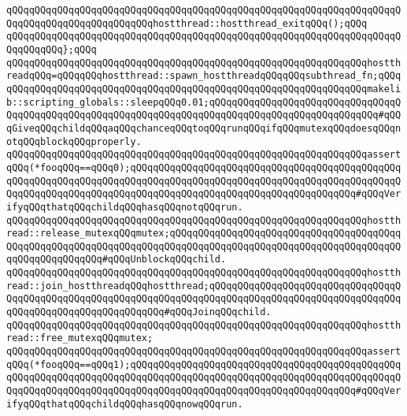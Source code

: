 \verb|qQQqqQQqqQQqqQQqqQQqqQQqqQQqqQQqqQQqqQQqqQQqqQQqqQQqqQQqqQQqqQQqqQQqqQQqqQQqqQQqqQQqqQQqqQQqqQQqhostthread::hostthread_exitqQQq();qQQq|\newline
\verb|qQQqqQQqqQQqqQQqqQQqqQQqqQQqqQQqqQQqqQQqqQQqqQQqqQQqqQQqqQQqqQQqqQQqqQQqqQQqqQQq};qQQq|\newline
\newline
\verb|qQQqqQQqqQQqqQQqqQQqqQQqqQQqqQQqqQQqqQQqqQQqqQQqqQQqqQQqqQQqqQQqhostthreadqQQq=qQQqqQQqhostthread::spawn_hostthreadqQQqqQQqsubthread_fn;qQQq|\newline
\newline
\verb|qQQqqQQqqQQqqQQqqQQqqQQqqQQqqQQqqQQqqQQqqQQqqQQqqQQqqQQqqQQqqQQqmakelib::scripting_globals::sleepqQQq0.01;qQQqqQQqqQQqqQQqqQQqqQQqqQQqqQQqqQQqqQQqqQQqqQQqqQQqqQQqqQQqqQQqqQQqqQQqqQQqqQQqqQQqqQQqqQQqqQQqqQQq#qQQqGiveqQQqchildqQQqaqQQqchanceqQQqtoqQQqrunqQQqifqQQqmutexqQQqdoesqQQqnotqQQqblockqQQqproperly.|\newline
\newline
\verb|qQQqqQQqqQQqqQQqqQQqqQQqqQQqqQQqqQQqqQQqqQQqqQQqqQQqqQQqqQQqqQQqassertqQQq(*fooqQQq==qQQq0);qQQqqQQqqQQqqQQqqQQqqQQqqQQqqQQqqQQqqQQqqQQqqQQqqQQqqQQqqQQqqQQqqQQqqQQqqQQqqQQqqQQqqQQqqQQqqQQqqQQqqQQqqQQqqQQqqQQqqQQqqQQqqQQqqQQqqQQqqQQqqQQqqQQqqQQqqQQqqQQqqQQqqQQqqQQqqQQqqQQq#qQQqVerifyqQQqthatqQQqchildqQQqhasqQQqnotqQQqrun.|\newline
\newline
\verb|qQQqqQQqqQQqqQQqqQQqqQQqqQQqqQQqqQQqqQQqqQQqqQQqqQQqqQQqqQQqqQQqhostthread::release_mutexqQQqmutex;qQQqqQQqqQQqqQQqqQQqqQQqqQQqqQQqqQQqqQQqqQQqqQQqqQQqqQQqqQQqqQQqqQQqqQQqqQQqqQQqqQQqqQQqqQQqqQQqqQQqqQQqqQQqqQQqqQQqqQQqqQQqqQQq#qQQqUnblockqQQqchild.|\newline
\newline
\verb|qQQqqQQqqQQqqQQqqQQqqQQqqQQqqQQqqQQqqQQqqQQqqQQqqQQqqQQqqQQqqQQqhostthread::join_hostthreadqQQqhostthread;qQQqqQQqqQQqqQQqqQQqqQQqqQQqqQQqqQQqqQQqqQQqqQQqqQQqqQQqqQQqqQQqqQQqqQQqqQQqqQQqqQQqqQQqqQQqqQQqqQQqqQQqqQQqqQQqqQQqqQQqqQQqqQQqqQQq#qQQqJoinqQQqchild.|\newline
\newline
\verb|qQQqqQQqqQQqqQQqqQQqqQQqqQQqqQQqqQQqqQQqqQQqqQQqqQQqqQQqqQQqqQQqhostthread::free_mutexqQQqmutex;|\newline
\newline
\verb|qQQqqQQqqQQqqQQqqQQqqQQqqQQqqQQqqQQqqQQqqQQqqQQqqQQqqQQqqQQqqQQqassertqQQq(*fooqQQq==qQQq1);qQQqqQQqqQQqqQQqqQQqqQQqqQQqqQQqqQQqqQQqqQQqqQQqqQQqqQQqqQQqqQQqqQQqqQQqqQQqqQQqqQQqqQQqqQQqqQQqqQQqqQQqqQQqqQQqqQQqqQQqqQQqqQQqqQQqqQQqqQQqqQQqqQQqqQQqqQQqqQQqqQQqqQQqqQQqqQQqqQQq#qQQqVerifyqQQqthatqQQqchildqQQqhasqQQqnowqQQqrun.|\newline
